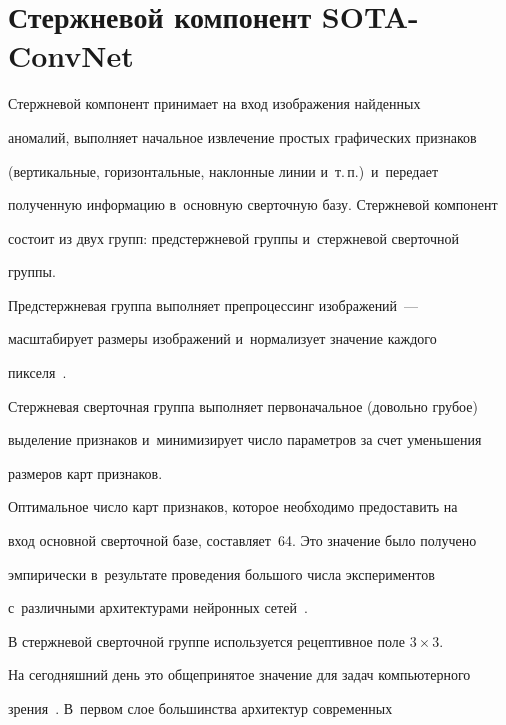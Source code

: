 \section{Стержневой компонент SOTA-ConvNet}





  Стержневой компонент принимает на вход изображения найденных 


аномалий, выполняет начальное извлечение простых графических признаков 


(вертикальные, горизонтальные, наклонные линии и~т.\,п.)\ и~передает 


полученную информацию в~основную сверточную базу. Стержневой компонент 


состоит из двух групп: предстержневой группы и~стержневой сверточной 


группы. 


  


  Предстержневая группа выполняет препроцессинг изображений~--- 


масштабирует размеры изображений и~нормализует значение каждого 


пикселя~\cite{9-ar}.


  


  Стержневая сверточная группа выполняет первоначальное (довольно грубое) 


выделение признаков и~минимизирует число параметров за счет уменьшения 


размеров карт признаков.


  


  Оптимальное число карт признаков, которое необходимо предоставить на 


вход основной сверточной базе, составляет~64. Это значение было получено 


эмпирически в~результате проведения большого числа экспериментов 


с~различными архитектурами нейронных сетей~\cite{9-ar}.


  


  В стержневой сверточной группе используется рецептивное поле $3\times 3$. 


На сегодняшний день это общепринятое значение для задач компьютерного 


зрения~\cite{9-ar}. В~первом слое большинства архитектур современных 


